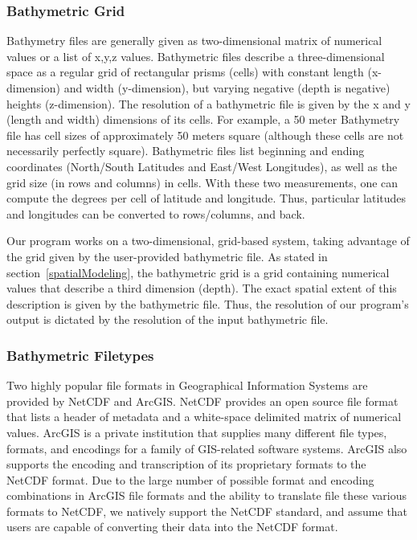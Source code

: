 \subsubsection{Bathymetric Grid}
\label{bathymetricGrid}
Bathymetry files are generally given as two-dimensional matrix of numerical values or a list of x,y,z values.  Bathymetric files describe a three-dimensional space as a regular grid of rectangular prisms (cells) with constant length (x-dimension) and width (y-dimension), but varying negative (depth is negative)  heights (z-dimension).  The resolution of a bathymetric file is given by the x and y (length and width) dimensions of its cells.  For example, a 50 meter Bathymetry file has cell sizes of approximately 50 meters square (although these cells are not necessarily perfectly square).  Bathymetric files list beginning and ending coordinates (North/South Latitudes and East/West Longitudes), as well as the grid size (in rows and columns) in cells.  With these two measurements, one can compute the degrees per cell of latitude and longitude.  Thus, particular latitudes and longitudes can be converted to rows/columns, and back.  

Our program works on a two-dimensional, grid-based system, taking advantage of the grid given by the user-provided bathymetric file.  As stated in section~\ref{spatialModeling}, the bathymetric grid is a grid containing numerical values that describe a third dimension (depth).  The exact spatial extent of this description is given by the bathymetric file.  Thus, the resolution of our program's output is dictated by the resolution of the input bathymetric file. 

\subsubsection{Bathymetric Filetypes}
Two highly popular file formats in Geographical Information Systems are provided by NetCDF and ArcGIS.  NetCDF provides an open source file format that lists a header of metadata and a white-space delimited matrix of numerical values.  ArcGIS is a private institution that supplies many different file types, formats, and encodings for a family of GIS-related software systems.  ArcGIS also supports the encoding and transcription of its proprietary formats to the NetCDF format.  Due to the large number of possible format and encoding combinations in ArcGIS file formats and the ability to translate file these various formats to NetCDF, we natively support the NetCDF standard, and assume that users are capable of converting their data into the NetCDF format.  


